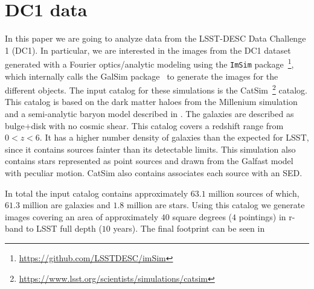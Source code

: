 \documentclass[\docopts]{\docclass}
\begin{document}
\section{DC1 data}
\label{sec:data}
In this paper we are going to analyze data from the LSST-DESC Data Challenge 1 (DC1). In particular, we are interested in the images from the DC1 dataset generated with a Fourier optics/analytic modeling using the \texttt{ImSim} package~\footnote{\url{https://github.com/LSSTDESC/imSim}}, which internally calls the GalSim package~\citep{2015A&C....10..121R}  to generate the images for the different objects. The input catalog for these simulations is the CatSim~\footnote{\url{https://www.lsst.org/scientists/simulations/catsim}} catalog. This catalog is based on the dark matter haloes from the Millenium simulation and a semi-analytic baryon model described in \citep{2006MNRAS.366..499D}. The galaxies are described as bulge+disk with no cosmic shear. This catalog covers a redshift range from $0 < z < 6$. It has a higher number density of galaxies than the expected for LSST, since it contains sources fainter than its detectable limits. This simulation also contains stars represented as point sources and drawn from the Galfast model~\citep{2008ApJ...673..864J} with peculiar motion. CatSim also contains associates each source with an SED.

In total the input catalog contains approximately $63.1$ million sources of which, $61.3$ million are galaxies and $1.8$ million are stars. Using this catalog we generate images covering an area of approximately $40$ square degrees ($4$ pointings) in r-band to LSST full depth ($10$ years). The final footprint can be seen in 
\end{document}
